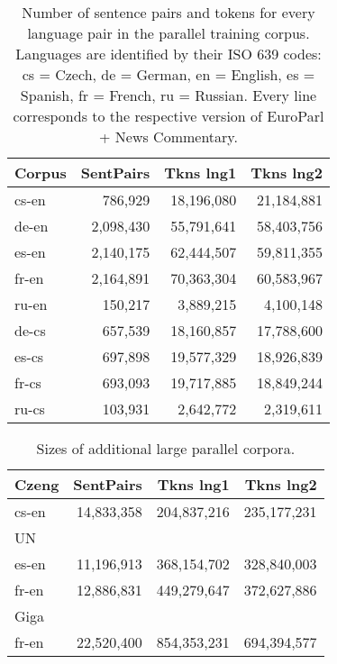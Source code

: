 \documentclass[11pt,letterpaper]{article}
\begin{document}
\begin{table}[htbl]
\begin{center}
\begin{tabular}{l | r r r}
Corpus & SentPairs & Tkns lng1 & Tkns lng2\\
\hline
cs-en & 786,929 & 18,196,080 & 21,184,881\\
de-en & 2,098,430 & 55,791,641 & 58,403,756\\
es-en & 2,140,175 & 62,444,507 & 59,811,355\\
fr-en & 2,164,891 & 70,363,304 & 60,583,967\\
ru-en & 150,217 & 3,889,215 & 4,100,148\\
de-cs & 657,539 & 18,160,857 & 17,788,600\\
es-cs & 697,898 & 19,577,329 & 18,926,839\\
fr-cs & 693,093 & 19,717,885 & 18,849,244\\
ru-cs & 103,931 & 2,642,772 & 2,319,611\\
\end{tabular}
\end{center}
\caption{Number of sentence pairs and tokens for every language pair in the parallel training corpus. Languages are identified by their ISO 639 codes: cs = Czech, de = German, en = English, es = Spanish, fr = French, ru = Russian.
Every line corresponds
to the respective version of EuroParl + News Commentary.}
\label{tab:newscommentary}
\end{table}

\begin{table}[h!]
\begin{center}
{\small
\begin{tabular}{l | r r r}
Czeng & SentPairs & Tkns lng1 & Tkns lng2\\
\hline
cs-en & 14,833,358 & 204,837,216 & 235,177,231\\
\hline
UN & & &\\
\hline
es-en & 11,196,913 & 368,154,702 & 328,840,003\\
fr-en & 12,886,831 & 449,279,647 & 372,627,886\\
\hline
Giga & & &\\
\hline
fr-en & 22,520,400 & 854,353,231 & 694,394,577\\
\end{tabular}
}
\end{center}
\caption{Sizes of additional large parallel corpora.}
\label{tab:largeparallel}
\end{table}
\end{document}
